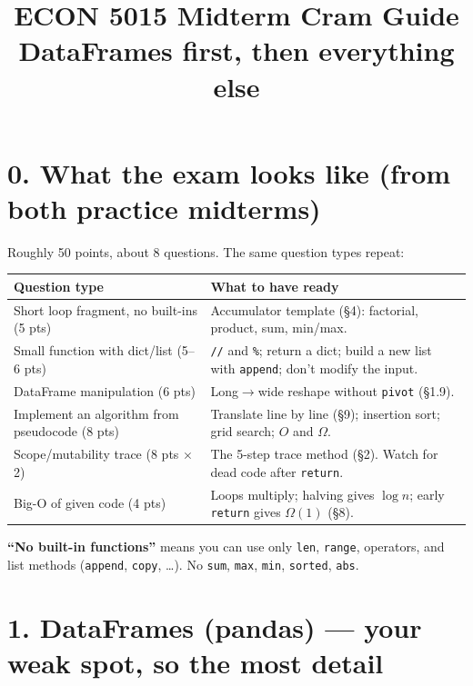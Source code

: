 \documentclass[10pt]{article}
\title{ECON 5015 Midterm Cram Guide\\\large DataFrames first, then everything else}
\date{}
\newcommand{\code}[1]{\lstinline[basicstyle=\ttfamily\small]{#1}}
\begin{document}
\maketitle
\vspace{-3em}

\section*{0. What the exam looks like (from both practice midterms)}
Roughly 50 points, about 8 questions. The same question types repeat:
\begin{center}
\small
\begin{tabular}{p{}p{}}
\hline
\textbf{Question type} & \textbf{What to have ready} \\ \hline
Short loop fragment, no built-ins (5 pts) & Accumulator template (\S4): factorial, product, sum, min/max. \\
Small function with dict/list (5--6 pts) & \texttt{//} and \texttt{\%}; return a dict; build a new list with \code{append}; don't modify the input. \\
DataFrame manipulation (6 pts) & Long$\to$wide reshape without \code{pivot} (\S1.9). \\
Implement an algorithm from pseudocode (8 pts) & Translate line by line (\S9); insertion sort; grid search; $O$ and $\Omega$. \\
Scope/mutability trace (8 pts $\times$2) & The 5-step trace method (\S2). Watch for dead code after \code{return}. \\
Big-O of given code (4 pts) & Loops multiply; halving gives $\log n$; early \code{return} gives $\Omega(1)$ (\S8). \\ \hline
\end{tabular}
\end{center}
\textbf{``No built-in functions''} means you can use only \code{len}, \code{range}, operators, and list methods (\code{append}, \code{copy}, \ldots). No \code{sum}, \code{max}, \code{min}, \code{sorted}, \code{abs}.

\section*{1. DataFrames (pandas) --- your weak spot, so the most detail}
\end{document}
